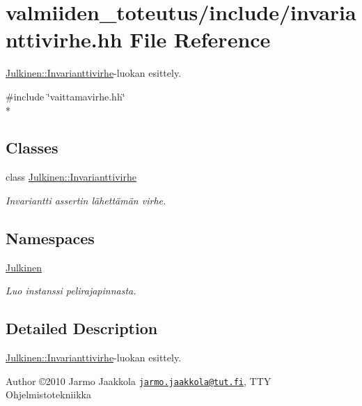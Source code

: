 \hypertarget{invarianttivirhe_8hh}{}\section{valmiiden\+\_\+toteutus/include/invarianttivirhe.hh File Reference}
\label{invarianttivirhe_8hh}


\hyperlink{class_julkinen_1_1_invarianttivirhe}{Julkinen\+::\+Invarianttivirhe}-\/luokan esittely.  


{\ttfamily \#include \char`\"{}vaittamavirhe.\+hh\char`\"{}}\\*
\subsection*{Classes}
\begin{DoxyCompactItemize}
\item 
class \hyperlink{class_julkinen_1_1_invarianttivirhe}{Julkinen\+::\+Invarianttivirhe}
\begin{DoxyCompactList}\small\item\em Invariantti assertin lähettämän virhe. \end{DoxyCompactList}\end{DoxyCompactItemize}
\subsection*{Namespaces}
\begin{DoxyCompactItemize}
\item 
 \hyperlink{namespace_julkinen}{Julkinen}
\begin{DoxyCompactList}\small\item\em Luo instanssi pelirajapinnasta. \end{DoxyCompactList}\end{DoxyCompactItemize}


\subsection{Detailed Description}
\hyperlink{class_julkinen_1_1_invarianttivirhe}{Julkinen\+::\+Invarianttivirhe}-\/luokan esittely. 

\begin{DoxyAuthor}{Author}
©2010 Jarmo Jaakkola \href{mailto:jarmo.jaakkola@tut.fi}{\tt jarmo.\+jaakkola@tut.\+fi}, T\+T\+Y Ohjelmistotekniikka 
\end{DoxyAuthor}
